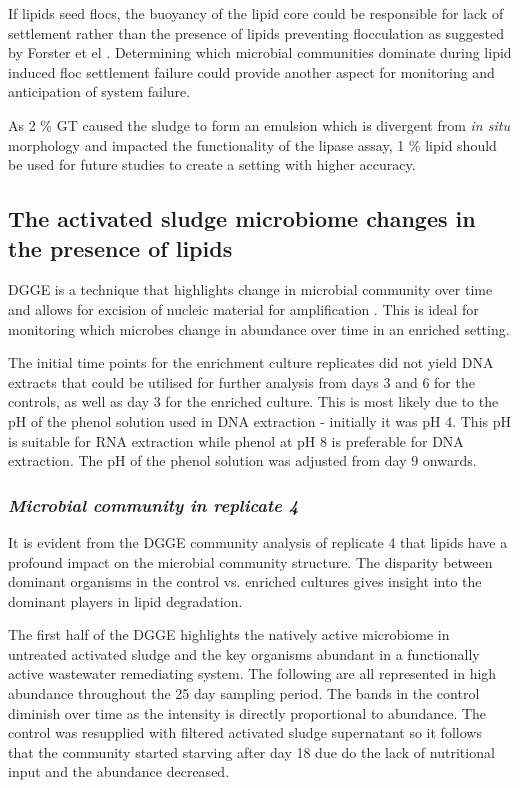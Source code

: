 \documentclass[11pt]{article}
\begin{document}
If lipids seed flocs, the buoyancy of the lipid core could be responsible for lack of settlement rather than the presence of lipids preventing flocculation as suggested by Forster et el \citep{Forster_92}. Determining which microbial communities dominate during lipid induced floc settlement failure could provide another aspect for monitoring and anticipation of system failure.


As 2 \% GT caused the sludge to form an emulsion which is divergent from \emph{in situ} morphology and impacted the functionality of the lipase assay, 1 \% lipid should be used for future studies to create a setting with higher accuracy.

\subsection{The activated sludge microbiome changes in the presence of lipids}
DGGE is a technique that highlights change in microbial community over time and allows for excision of nucleic material for amplification \cite{yang2012evolution}. This is ideal for monitoring which microbes change in abundance over time in an enriched setting.



The initial time points for the enrichment culture replicates did not yield DNA extracts that could be utilised for further analysis from days 3 and 6 for the controls, as well as day 3 for the enriched culture. This is most likely due to the pH of the phenol solution used in DNA extraction - initially it was pH 4. This pH is suitable for RNA extraction while phenol at pH 8 is preferable for DNA extraction. The pH of the phenol solution was adjusted from day 9 onwards.

\subsubsection{\emph{Microbial community in replicate 4}}
It is evident from the DGGE community analysis of replicate 4 that lipids have a profound impact on the microbial community structure. The disparity between dominant organisms in the control vs. enriched cultures gives insight into the dominant players in lipid degradation. 

The first half of the DGGE highlights the natively active microbiome in untreated activated sludge and the key organisms abundant in a functionally active wastewater remediating system. The following are all represented in high abundance throughout the 25 day sampling period. The bands in the control diminish over time as the intensity is directly proportional to abundance. The control was resupplied with filtered activated sludge supernatant so it follows that the community started starving after day 18 due do the lack of nutritional input and the abundance decreased.
\end{document}

